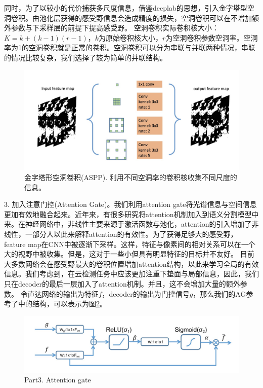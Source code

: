 \documentclass[UTF8]{ctexart}
\begin{document}
同时，为了以较小的代价捕获多尺度信息，借鉴deeplab的思想\cite{chen2017deeplab}，引入金字塔型空洞卷积。由池化层获得的感受野信息会造成精度的损失，空洞卷积可以在不增加额外参数与下采样层的前提下提高感受野。
空洞卷积实际卷积核大小：$K=k+(k-1)(r-1)$，$k$为原始卷积核大小，$r$为空洞卷积参数空洞率。空洞率为1的空洞卷积就是正常的卷积。空洞卷积可以分为串联与并联两种情况，串联的情况比较复杂，我们选择了较为简单的并联结构。

\begin{figure}[H]
    \centering
    \includegraphics[scale=0.25]{../pic/aspp.jpg}
    \caption[]{金字塔形空洞卷积(ASPP). 利用不同空洞率的卷积核收集不同尺度的信息。}
    \label{pic:aspp}
\end{figure}

3. 加入注意门控(Attention Gate)。我们利用attention gate将光谱信息与空间信息更加有效地融合起来。近年来，有很多研究将attention机制加入到语义分割模型中来。在神经网络中，非线性主要来源于激活函数与池化，attention的引入增加了非线性，一部分人以此来解释attention的有效性。为了获得足够大的感受野，feature map在CNN中被逐渐下采样。这样，特征与像素间的相对关系可以在一个大的视野中被收集。但是，这对于一些小但具有明显特征的目标并不友好。
目前大多数网络会在感受野最大的卷积位置增加attention结构，以此来学习全局的有效信息。我们考虑到，在云检测任务中应该更加注重下垫面与局部信息，因此，我们只在decoder的最后一层加入了attention机制。并且，这不会增加大量的额外参数。
令直达网络的输出为特征$f$，decoder的输出为门控信号$g$，那么我们的AG参考了\cite{oktay2018attention}中的结构，可以表示为图\ref{pic:AG}。

\begin{figure}[H]
    \centering
    \includegraphics[scale=0.25]{../pic/AG.jpg}
    \caption[]{Part3. Attention gate}
    \label{pic:AG}
\end{figure}
\end{document}
